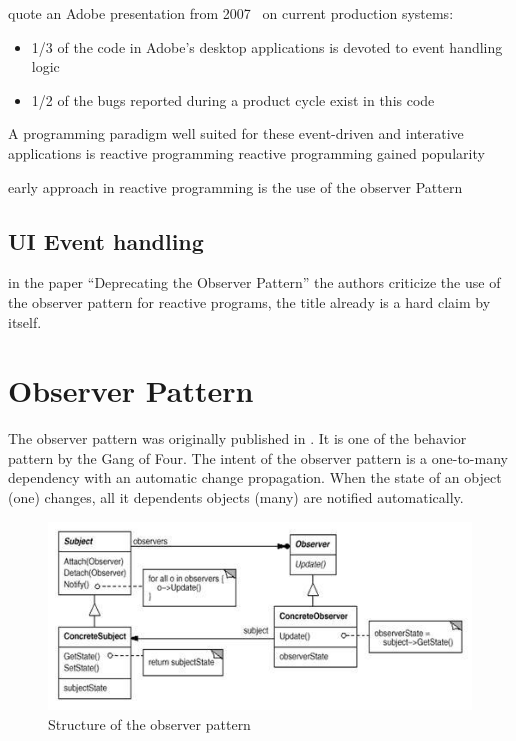 \documentclass[acmsmall]{acmart}\settopmatter{printfolios=true,printccs=false,printacmref=false}
\begin{document}
	quote an Adobe presentation from 2007~\cite{parent2006possible} on current production systems:
	\begin{itemize}
		\item 1/3 of the code in Adobe’s desktop applications is devoted to event handling logic	
		\item 1/2 of the bugs reported during a product cycle exist in this code
	\end{itemize}


	
	A programming paradigm well suited for these event-driven and interative applications is reactive programming
	reactive programming gained popularity

	early approach in reactive programming is the use of the observer Pattern
	
	\subsection{UI Event handling}



	in the paper ``Deprecating the Observer Pattern'' the authors criticize the use of the observer pattern for reactive programs,
	the title already is a hard claim by itself.



\section{Observer Pattern}
	The observer pattern was originally published in \cite{Gamma:1995}. 
	It is one of the behavior pattern by the Gang of Four. 
	The intent of the observer pattern is a one-to-many dependency with an automatic change propagation.
	When the state of an object (one) changes, all it dependents objects (many) are notified automatically.

	\begin{figure}[H]
		\includegraphics{img/observer.jpg}
		\caption{Structure of the observer pattern~\cite{Gamma:1995}}
		\label{fig:observer}
	\end{figure}
\end{document}

